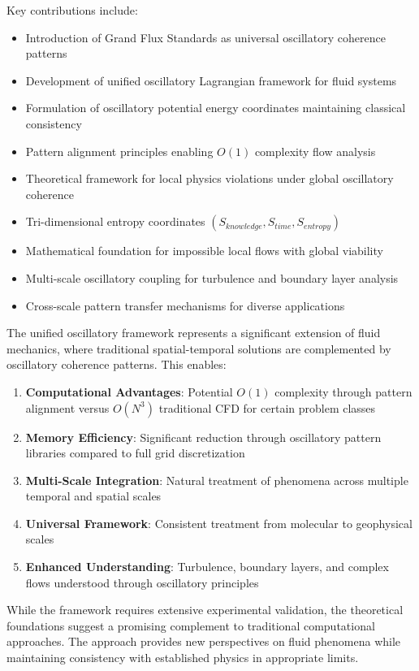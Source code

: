 \documentclass[12pt,a4paper]{article}
\begin{document}
Key contributions include:
\begin{itemize}
\item Introduction of Grand Flux Standards as universal oscillatory coherence patterns
\item Development of unified oscillatory Lagrangian framework for fluid systems
\item Formulation of oscillatory potential energy coordinates maintaining classical consistency
\item Pattern alignment principles enabling $O(1)$ complexity flow analysis
\item Theoretical framework for local physics violations under global oscillatory coherence
\item Tri-dimensional entropy coordinates $(S_{knowledge}, S_{time}, S_{entropy})$
\item Mathematical foundation for impossible local flows with global viability
\item Multi-scale oscillatory coupling for turbulence and boundary layer analysis
\item Cross-scale pattern transfer mechanisms for diverse applications
\end{itemize}

The unified oscillatory framework represents a significant extension of fluid mechanics, where traditional spatial-temporal solutions are complemented by oscillatory coherence patterns. This enables:

\begin{enumerate}
\item \textbf{Computational Advantages}: Potential $O(1)$ complexity through pattern alignment versus $O(N^3)$ traditional CFD for certain problem classes
\item \textbf{Memory Efficiency}: Significant reduction through oscillatory pattern libraries compared to full grid discretization
\item \textbf{Multi-Scale Integration}: Natural treatment of phenomena across multiple temporal and spatial scales
\item \textbf{Universal Framework}: Consistent treatment from molecular to geophysical scales
\item \textbf{Enhanced Understanding}: Turbulence, boundary layers, and complex flows understood through oscillatory principles
\end{enumerate}

While the framework requires extensive experimental validation, the theoretical foundations suggest a promising complement to traditional computational approaches. The approach provides new perspectives on fluid phenomena while maintaining consistency with established physics in appropriate limits.
\end{document}

